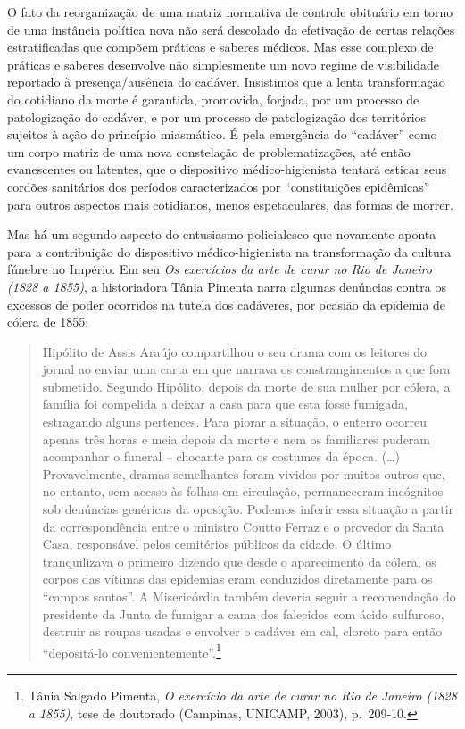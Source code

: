 O fato da reorganização de uma matriz normativa de controle obituário em
torno de uma instância política nova não será descolado da efetivação de
certas relações estratificadas que compõem práticas e saberes médicos.
Mas esse complexo de práticas e saberes desenvolve não simplesmente um
novo regime de visibilidade reportado à presença/ausência do cadáver.
Insistimos que a lenta transformação do cotidiano da morte é garantida,
promovida, forjada, por um processo de patologização do cadáver, e por
um processo de patologização dos territórios sujeitos à ação do
princípio miasmático. É pela emergência do ``cadáver'' como um corpo
matriz de uma nova constelação de problematizações, até então
evanescentes ou latentes, que o dispositivo médico-higienista tentará
esticar seus cordões sanitários dos períodos caracterizados por
``constituições epidêmicas'' para outros aspectos mais cotidianos, menos
espetaculares, das formas de morrer.

Mas há um segundo aspecto do entusiasmo policialesco que novamente
aponta para a contribuição do dispositivo médico-higienista na
transformação da cultura fúnebre no Império. Em seu \emph{Os exercícios
da arte de curar no Rio de Janeiro (1828 a 1855)}, a historiadora Tânia
Pimenta narra algumas denúncias contra os excessos de poder ocorridos na
tutela dos cadáveres, por ocasião da epidemia de cólera de 1855:

\begin{quote}
Hipólito de Assis Araújo compartilhou o seu drama com os leitores do
jornal ao enviar uma carta em que narrava os constrangimentos a que fora
submetido. Segundo Hipólito, depois da morte de sua mulher por cólera, a
família foi compelida a deixar a casa para que esta fosse fumigada,
estragando alguns pertences. Para piorar a situação, o enterro ocorreu
apenas três horas e meia depois da morte e nem os familiares puderam
acompanhar o funeral -- chocante para os costumes da época. (\ldots{})
Provavelmente, dramas semelhantes foram vividos por muitos outros que,
no entanto, sem acesso às folhas em circulação, permaneceram incógnitos
sob denúncias genéricas da oposição. Podemos inferir essa situação a
partir da correspondência entre o ministro Coutto Ferraz e o provedor da
Santa Casa, responsável pelos cemitérios públicos da cidade. O último
tranquilizava o primeiro dizendo que desde o aparecimento da cólera, os
corpos das vítimas das epidemias eram conduzidos diretamente para os
``campos santos''. A Misericórdia também deveria seguir a recomendação
do presidente da Junta de fumigar a cama dos falecidos com ácido
sulfuroso, destruir as roupas usadas e envolver o cadáver em cal,
cloreto para então ``depositá-lo convenientemente''.\footnote{Tânia
  Salgado Pimenta, \emph{O exercício da arte de curar no Rio de Janeiro
  (1828 a 1855)}, tese de doutorado (Campinas, UNICAMP, 2003),
  p.~209-10.}
\end{quote}


